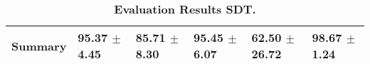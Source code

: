 \begin{table}[htb]
{\begin{tabular}{llllll}
\midrule
\textbf{Summary                                  } &        \phantom{0}95.37 $\pm$ \phantom{0}4.45 &            \phantom{0}85.71 $\pm$ \phantom{0}8.30 &        \phantom{0}95.45 $\pm$ \phantom{0}6.07 &            \phantom{0}62.50 $\pm$ 26.72 &  \phantom{0}98.67 $\pm$ \phantom{0}1.24 \\
\bottomrule
\end{tabular}%
}
\caption{\textbf{Evaluation Results SDT.}}
\label{tab:eval-results}
\end{table}
\newpage 

